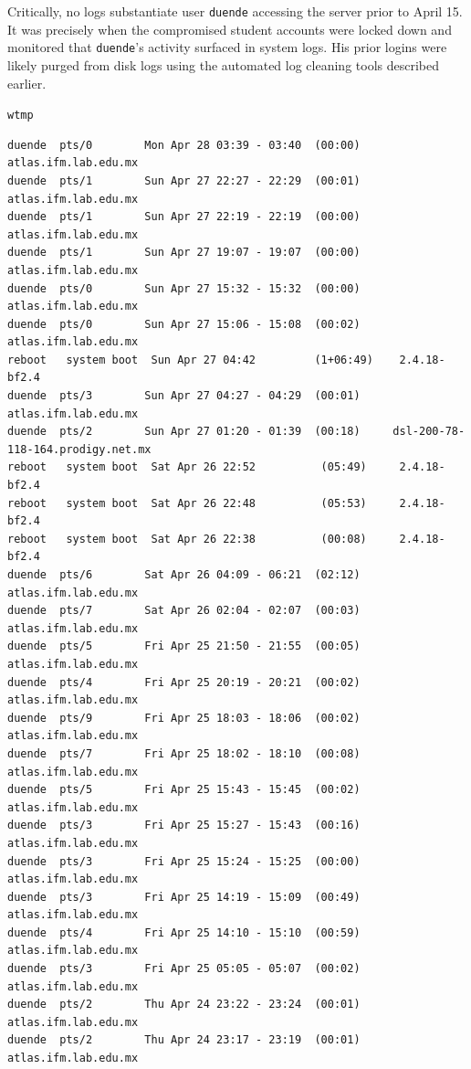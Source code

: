 Critically, no logs substantiate user \texttt{duende} accessing the server prior to April 15. It was precisely when the compromised student accounts were locked down and monitored that \texttt{duende}'s activity surfaced in system logs. His prior logins were likely purged from disk logs using the automated log cleaning tools described earlier.


\texttt{wtmp}

\vspace{1em}

\begin{lstlisting}[style=terminal]
duende  pts/0        Mon Apr 28 03:39 - 03:40  (00:00)     atlas.ifm.lab.edu.mx
duende  pts/1        Sun Apr 27 22:27 - 22:29  (00:01)     atlas.ifm.lab.edu.mx
duende  pts/1        Sun Apr 27 22:19 - 22:19  (00:00)     atlas.ifm.lab.edu.mx
duende  pts/1        Sun Apr 27 19:07 - 19:07  (00:00)     atlas.ifm.lab.edu.mx
duende  pts/0        Sun Apr 27 15:32 - 15:32  (00:00)     atlas.ifm.lab.edu.mx
duende  pts/0        Sun Apr 27 15:06 - 15:08  (00:02)     atlas.ifm.lab.edu.mx
reboot   system boot  Sun Apr 27 04:42         (1+06:49)    2.4.18-bf2.4
duende  pts/3        Sun Apr 27 04:27 - 04:29  (00:01)     atlas.ifm.lab.edu.mx
duende  pts/2        Sun Apr 27 01:20 - 01:39  (00:18)     dsl-200-78-118-164.prodigy.net.mx
reboot   system boot  Sat Apr 26 22:52          (05:49)     2.4.18-bf2.4
reboot   system boot  Sat Apr 26 22:48          (05:53)     2.4.18-bf2.4
reboot   system boot  Sat Apr 26 22:38          (00:08)     2.4.18-bf2.4
duende  pts/6        Sat Apr 26 04:09 - 06:21  (02:12)     atlas.ifm.lab.edu.mx
duende  pts/7        Sat Apr 26 02:04 - 02:07  (00:03)     atlas.ifm.lab.edu.mx
duende  pts/5        Fri Apr 25 21:50 - 21:55  (00:05)     atlas.ifm.lab.edu.mx
duende  pts/4        Fri Apr 25 20:19 - 20:21  (00:02)     atlas.ifm.lab.edu.mx
duende  pts/9        Fri Apr 25 18:03 - 18:06  (00:02)     atlas.ifm.lab.edu.mx
duende  pts/7        Fri Apr 25 18:02 - 18:10  (00:08)     atlas.ifm.lab.edu.mx
duende  pts/5        Fri Apr 25 15:43 - 15:45  (00:02)     atlas.ifm.lab.edu.mx
duende  pts/3        Fri Apr 25 15:27 - 15:43  (00:16)     atlas.ifm.lab.edu.mx
duende  pts/3        Fri Apr 25 15:24 - 15:25  (00:00)     atlas.ifm.lab.edu.mx
duende  pts/3        Fri Apr 25 14:19 - 15:09  (00:49)     atlas.ifm.lab.edu.mx
duende  pts/4        Fri Apr 25 14:10 - 15:10  (00:59)     atlas.ifm.lab.edu.mx
duende  pts/3        Fri Apr 25 05:05 - 05:07  (00:02)     atlas.ifm.lab.edu.mx
duende  pts/2        Thu Apr 24 23:22 - 23:24  (00:01)     atlas.ifm.lab.edu.mx
duende  pts/2        Thu Apr 24 23:17 - 23:19  (00:01)     atlas.ifm.lab.edu.mx

\end{lstlisting}
